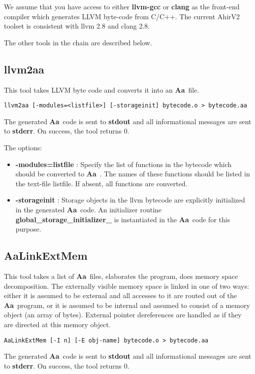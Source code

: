 \documentclass{article}
\newcommand{\Aa}{{\bf Aa}~}
\begin{document}
We assume that you have access to either {\bf llvm-gcc}
or {\bf clang} as the front-end compiler which generates
LLVM byte-code from C/C++.  The current AhirV2 toolset
is consistent with llvm 2.8 and clang 2.8.

The other tools in the chain are described below.

\subsection{{\bf llvm2aa}}

This tool takes LLVM byte code and converts it into an
\Aa file.
\begin{verbatim}
llvm2aa [-modules=<listfile>] [-storageinit] bytecode.o > bytecode.aa
\end{verbatim}
The generated \Aa code is sent to {\bf stdout} and all informational
messages are sent to {\bf stderr}.  On success, the tool returns 0.

The options:
\begin{itemize}
\item {\bf -modules=listfile} : Specify the list of functions in the bytecode
which should be converted to \Aa.   The names of these functions should be
listed in the text-file listfile. If absent, all functions
are converted.
\item {\bf -storageinit} :  Storage objects in the llvm bytecode
are explicitly initialized in the generated \Aa code.   An initializer
routine {\bf global\_storage\_initializer\_} is instantiated in
the \Aa code for this purpose.
\end{itemize}

\subsection{{\bf AaLinkExtMem}}

This tool takes a list of \Aa files, elaborates the program,
does memory space decomposition.  The externally visible memory space is
linked in one of two ways: either it is assumed to be external
and all accesses to it are routed out of the \Aa program,
or it is assumed to be internal and assumed to consist of
a memory object (an array of bytes).  External pointer dereferences
are handled as if they are directed at this memory object.
\begin{verbatim}
AaLinkExtMem [-I n] [-E obj-name] bytecode.o > bytecode.aa
\end{verbatim}
The generated \Aa code is sent to {\bf stdout} and all informational
messages are sent to {\bf stderr}.  On success, the tool returns 0.
\end{document}
